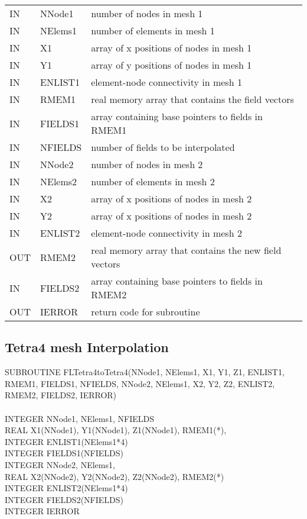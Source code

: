 \documentclass[a4paper]{article}
\begin{document}
\vspace{5mm}

\begin{supertabular}{lll}
IN  & NNode1   & number of nodes in mesh 1\\ 
IN  & NElems1  & number of elements in mesh 1\\ 
IN  & X1       & array of x positions of nodes in mesh 1\\ 
IN  & Y1       & array of y positions of nodes in mesh 1\\
IN  & ENLIST1  & element-node connectivity in mesh 1\\ 
IN  & RMEM1    & real memory array that contains the field vectors\\
IN  & FIELDS1  & array containing base pointers to fields in RMEM1\\ 
IN  & NFIELDS  & number of fields to be interpolated\\ 
IN  & NNode2   & number of nodes in mesh 2\\ 
IN  & NElems2  & number of elements in mesh 2\\ 
IN  & X2       & array of x positions of nodes in mesh 2\\ 
IN  & Y2       & array of x positions of nodes in mesh 2\\
IN  & ENLIST2  & element-node connectivity in mesh 2\\ 
OUT & RMEM2    & real memory array that contains the new field vectors\\
IN  & FIELDS2  & array containing base pointers to fields in RMEM2\\ 
OUT & IERROR   & return code for subroutine\\
\end{supertabular}

\subsection{Tetra4 mesh Interpolation}
SUBROUTINE FLTetra4toTetra4(NNode1, NElems1, X1, Y1, Z1, ENLIST1, RMEM1, FIELDS1, NFIELDS,
NNode2, NElems1, X2, Y2, Z2, ENLIST2, RMEM2, FIELDS2, IERROR)\\
\\
\noindent INTEGER NNode1, NElems1, NFIELDS         \\
REAL X1(NNode1), Y1(NNode1), Z1(NNode1), RMEM1(*), \\
INTEGER ENLIST1(NElems1*4)                         \\
INTEGER FIELDS1(NFIELDS)                           \\
INTEGER NNode2, NElems1,                           \\
REAL X2(NNode2), Y2(NNode2), Z2(NNode2), RMEM2(*)  \\
INTEGER ENLIST2(NElems1*4)                         \\
INTEGER FIELDS2(NFIELDS)                           \\
INTEGER IERROR
\end{document}
